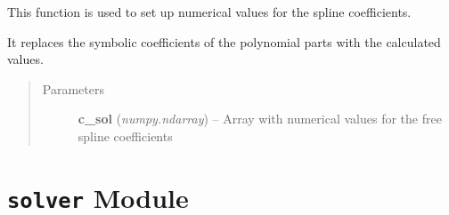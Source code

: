 \documentclass[letterpaper,10pt,english]{sphinxmanual}
\begin{document}
\begin{fulllineitems}
\begin{fulllineitems}
\label{pytrajectory:pytrajectory.spline.CubicSpline.set_coeffs}
This function is used to set up numerical values for the spline coefficients.

It replaces the symbolic coefficients of the polynomial parts with the calculated values.
\begin{quote}\begin{description}
\item[{Parameters}] \leavevmode
\textbf{c\_sol} (\emph{numpy.ndarray}) -- Array with numerical values for the free spline coefficients

\end{description}\end{quote}

\end{fulllineitems}


\end{fulllineitems}



\section{\texttt{solver} Module}
\label{pytrajectory:module-pytrajectory.solver}\label{pytrajectory:solver-module}
\end{document}

